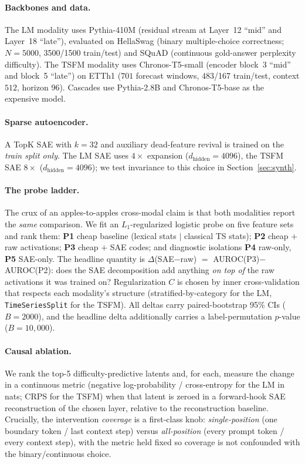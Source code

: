 \documentclass[11pt]{article}
\newcommand{\sae}{SAE}
\begin{document}
\paragraph{Backbones and data.}
The LM modality uses Pythia-410M \citep{biderman2023pythia} (residual stream at
Layer~12 ``mid'' and Layer~18 ``late''), evaluated on HellaSwag
\citep{zellers2019hellaswag} (binary multiple-choice correctness; $N{=}5000$,
3500/1500 train/test) and SQuAD \citep{rajpurkar2016squad} (continuous
gold-answer perplexity difficulty). The TSFM modality uses Chronos-T5-small
\citep{ansari2024chronos} (encoder block~3 ``mid'' and block~5 ``late'')
on ETTh1 \citep{zhou2021informer} ($701$ forecast windows, 483/167 train/test,
context $512$, horizon $96$). Cascades use Pythia-2.8B and Chronos-T5-base as the
expensive model.

\paragraph{Sparse autoencoder.}
A TopK \sae{} with $k{=}32$ and auxiliary dead-feature revival is trained on the
\emph{train split only}. The LM \sae{} uses $4\times$ expansion ($d_{\text{hidden}}{=}4096$),
the TSFM \sae{} $8\times$ ($d_{\text{hidden}}{=}4096$); we test invariance to this
choice in Section~\ref{sec:synth}.

\paragraph{The probe ladder.}
The crux of an apples-to-apples cross-modal claim is that both modalities report
the \emph{same} comparison. We fit an $L_1$-regularized logistic probe on five
feature sets and rank them: \textbf{P1} cheap baseline (lexical stats $\mid$
classical TS stats); \textbf{P2} cheap $+$ raw activations; \textbf{P3} cheap $+$
\sae{} codes; and diagnostic isolations \textbf{P4} raw-only, \textbf{P5}
\sae{}-only. The headline quantity is $\Delta$(\sae{}$-$raw) $=$ AUROC(P3)$-$AUROC(P2):
does the \sae{} decomposition add anything \emph{on top of} the raw activations it
was trained on? Regularization $C$ is chosen by inner cross-validation that
respects each modality's structure (stratified-by-category for the LM,
\texttt{TimeSeriesSplit} for the TSFM). All deltas carry paired-bootstrap 95\%
CIs ($B{=}2000$), and the headline delta additionally carries a label-permutation
$p$-value ($B{=}10{,}000$).

\paragraph{Causal ablation.}
We rank the top-5 difficulty-predictive latents and, for each, measure the change
in a continuous metric (negative log-probability / cross-entropy for the LM in
nats; CRPS \citep{gneiting2007strictly} for the TSFM) when that latent is zeroed
in a forward-hook \sae{} reconstruction of the chosen layer, relative to the
reconstruction baseline. Crucially, the intervention \emph{coverage} is a
first-class knob: \emph{single-position} (one boundary token / last context step)
versus \emph{all-position} (every prompt token / every context step), with the
metric held fixed so coverage is not confounded with the binary/continuous choice.
\end{document}
